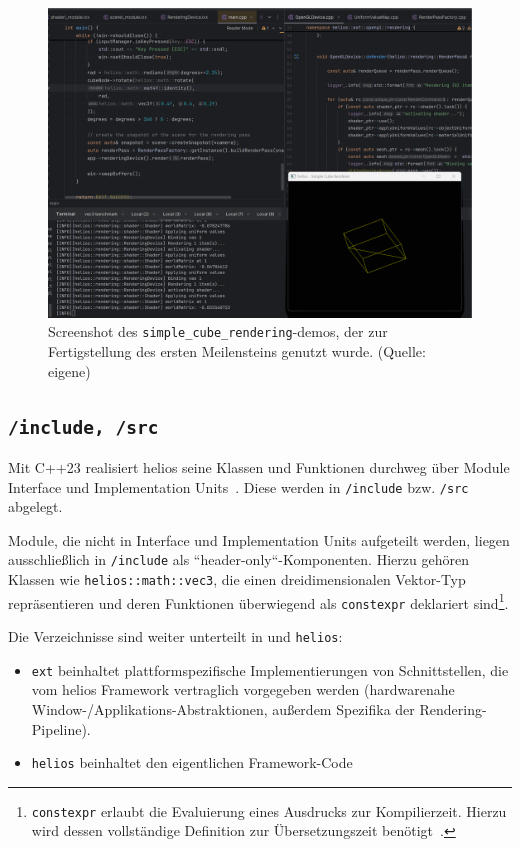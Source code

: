 \begin{figure}[!h]
    \centering
    \includegraphics[width=1\columnwidth]{img/cube_example}
    \caption{Screenshot des \texttt{simple\_cube\_rendering}-demos, der zur Fertigstellung des ersten Meilensteins genutzt wurde. (Quelle: eigene)}
    \label{fig:simple-cube-rendering-demo}
\end{figure}

\subsection*{\texttt{/include, /src}}
Mit C++23 realisiert helios seine Klassen und Funktionen durchweg über Module Interface und Implementation Units~\cite[211 f.]{Str24}. Diese werden in \texttt{/include} bzw. \texttt{/src} abgelegt.\par
Module, die nicht in Interface und Implementation Units aufgeteilt werden, liegen ausschließlich in \texttt{/include} als ``header-only``-Komponenten.
Hierzu gehören Klassen wie \texttt{helios::math::vec3}, die einen dreidimensionalen Vektor-Typ repräsentieren und deren Funktionen überwiegend als \texttt{constexpr} deklariert sind\footnote{
    \texttt{constexpr} erlaubt die Evaluierung eines Ausdrucks zur Kompilierzeit. Hierzu wird dessen vollständige Definition zur Übersetzungszeit benötigt~\cite[330 f.]{Gre24}.
}.\par
Die Verzeichnisse sind weiter unterteilt in  und \texttt{helios}:
\begin{itemize}
    \itemsep0.5em
    \item \texttt{ext} beinhaltet plattformspezifische Implementierungen von Schnittstellen, die vom helios Framework vertraglich vorgegeben werden (hardwarenahe Window-/Applikations-Abstraktionen, außerdem Spezifika der Rendering-Pipeline).
    \item \texttt{helios} beinhaltet den eigentlichen Framework-Code
\end{itemize}
